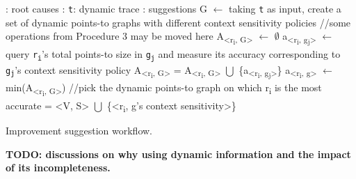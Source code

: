\begin{algorithm}[th!]
	\begin{algorithmic}[1]
		\renewcommand{\algorithmicrequire}{\textbf{Input:}}
		\renewcommand{\algorithmicensure}{\textbf{Output:}}
		: root causes
		\REQUIRE: {\tt t}: dynamic trace
		: suggestions
		\STATE G $\leftarrow$ taking {\tt t} as input, create a set of dynamic points-to graphs with different context sensitivity policies //some operations from Procedure 3 may be moved here
		\STATE A\textsubscript{<r\textsubscript{i}, G>} $\leftarrow$ $\emptyset$ 
		\STATE a\textsubscript{<r\textsubscript{i}, g\textsubscript{j}>} $\leftarrow$ query {\tt r\textsubscript{i}}'s total points-to size in {\tt g\textsubscript{j}} and measure its accuracy corresponding to {\tt g\textsubscript{j}}'s context sensitivity policy
		\STATE A\textsubscript{<r\textsubscript{i}, G>} = A\textsubscript{<r\textsubscript{i}, G>} $\bigcup$ \{a\textsubscript{<r\textsubscript{i}, g\textsubscript{j}>}\}
		\ENDFOR
		\STATE a\textsubscript{<r\textsubscript{i}, g>} $\leftarrow$ min(A\textsubscript{<r\textsubscript{i}, G>}) //pick the dynamic points-to graph on which r\textsubscript{i} is the most accurate
		\STATE <V, S> = <V, S> $\bigcup$ \{<r\textsubscript{i}, g's context sensitivity>\}
		\ENDFOR
	\end{algorithmic}
	\caption{Improvement suggestion workflow.}
	\label{alg:suggestion}
\end{algorithm}


{\bf TODO: discussions on why using dynamic information and the impact of its incompleteness.} 
